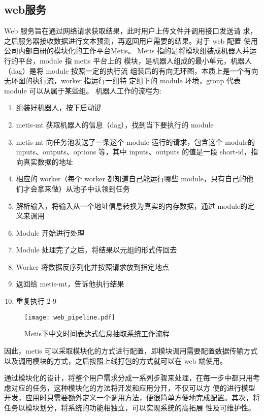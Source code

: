 \subsection{web服务}

Web 服务旨在通过网络请求获取结果，此时用户上传文件并调用接口发送请
求，之后服务器接收数据进行文本预测，再返回用户需要的结果。对于 web 配置
使用公司内部自研的模块化的工作平台Metis。
Metis 指的是将模块组装成机器人并运行的平台，module 指 metis 平台上的
模块，是机器人组成的最小单元，机器人（dag）是将 module 按照一定的执行流
组装后的有向无环图，本质上是一个有向无环图的执行流，worker 指运行一组特
定组下的 module 环境，group 代表 module 可以从属于某些组。
机器人工作的流程为:

\begin{enumerate}
    \item 组装好机器人，按下启动键
    \item metis-mt 获取机器人的信息（dag），找到当下要执行的 module
    \item metis-mt 向任务池发送了一条这个 module 运行的请求，包含这个 module的 inputs、outputs、options 等，其中 inputs、outputs 的值是一段 short-id，指向真实数据的地址
    \item 相应的 worker（每个 worker 都知道自己能运行哪些 module，只有自己的他们才会拿来做）从池子中认领到任务
    \item 解析输入，将输入从一个地址信息转换为真实的内存数据，通过 module的定义来调用
    \item Module 开始进行处理
    \item Module 处理完了之后，将结果以元组的形式传回去
    \item Worker 将数据反序列化并按照请求放到指定地点
    \item 返回给 metis-mt，告诉他执行结果
    \item 重复执行 2-9
\end{enumerate}


\begin{figure}[h]
    \centering
    \texttt{[image: web\_pipeline.pdf]}
    \caption{Metis下中文时间表达式信息抽取系统工作流程}
    \label{fig:web_pipeline}
\end{figure}

因此，metis 可以采取模块化的方式进行配置，即模块调用需要配置数据传输方式以及调用模块的方式，之后按照上线打包的方式就可以在 web 端使用。

通过模块化的设计，将整个用户需求分成一系列步骤来处理，在每一步中都只用考虑对应的任务，这种模块化的方法将开发和应用分开，不仅可以方
便的进行模型开发，应用时只需要额外定义一个调用方法，便很简单方便地完成配置。其次，将任务以模块划分，将系统的功能相独立，可以实现系统的高拓展
性及可维护性。

